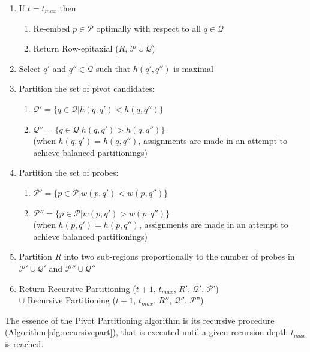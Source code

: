 \documentclass{llncs}
\begin{document}
\begin{algorithm}
\begin{minipage}{4.8in}
\begin{enumerate}
\item If $t = t_{max}$ then
  \begin{enumerate}
    \item Re-embed $p \in \mathcal{P}$ optimally with respect to all $q \in \mathcal{Q}$
    \item Return Row-epitaxial ($R$, $\mathcal{P} \cup \mathcal{Q}$)
  \end{enumerate}
\item Select $q'$ and $q'' \in \mathcal{Q}$ such that $h(q',q'')$ is maximal
\item \label{step:part_pivots} Partition the set of pivot candidates:
  \begin{enumerate}
    \item $\mathcal{Q}' = \{q \in \mathcal{Q} | h(q,q') < h(q,q'')\}$
    \item $\mathcal{Q}'' = \{q \in \mathcal{Q} | h(q,q') > h(q,q'')\}$ \\
    (when $h(q,q') = h(q,q'')$, assignments are made in an attempt to
    achieve balanced partitionings)
  \end{enumerate}
\item Partition the set of probes:
  \begin{enumerate}
    \item $\mathcal{P}' = \{p \in \mathcal{P} | w(p,q') < w(p,q'')\}$
    \item $\mathcal{P}'' = \{p \in \mathcal{P} | w(p,q') > w(p,q'')\}$ \\
    (when $h(p,q') = h(p,q'')$, assignments are made in an attempt to
    achieve balanced partitionings)
  \end{enumerate}
\item \label{step:part_r} Partition $R$ into two sub-regions proportionally to the number of probes
      in $\mathcal{P}' \cup \mathcal{Q}'$ and $\mathcal{P}'' \cup \mathcal{Q}''$
\item Return Recursive Partitioning ($t + 1$, $t_{max}$, $R'$, $\mathcal{Q}'$, $\mathcal{P}$') \\
      $\cup$ Recursive Partitioning ($t + 1$, $t_{max}$, $R''$, $\mathcal{Q}''$, $\mathcal{P}$'')
\end{enumerate}

\end{minipage}
\end{algorithm}

The essence of the Pivot Partitioning algorithm is its recursive procedure
(Algorithm\,\ref{alg:recursivepart}), that is executed until a given
recursion depth $t_{max}$ is reached.
\end{document}
